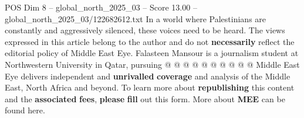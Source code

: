 \begin{textsample}{POS Dim 8 – global\_north\_2025\_03 – Score 13.00 – global\_north\_2025\_03/122682612.txt}
In a world where Palestinians are constantly and aggressively silenced, these voices need to be heard.
The views expressed in this article belong to the author and do not \textbf{necessarily} reflect the editorial policy of Middle East Eye.
Falasteen Mansour is a journalism student at Northwestern University in Qatar, pursuing @ @ @ @ @ @ @ @ @ @ Middle East Eye delivers independent and \textbf{unrivalled} \textbf{coverage} and analysis of the Middle East, North Africa and beyond.
To learn more about \textbf{republishing} this content and the \textbf{associated} \textbf{fees}, \textbf{please} \textbf{fill} out this form.
More about \textbf{MEE} can be found here.

\end{textsample}
